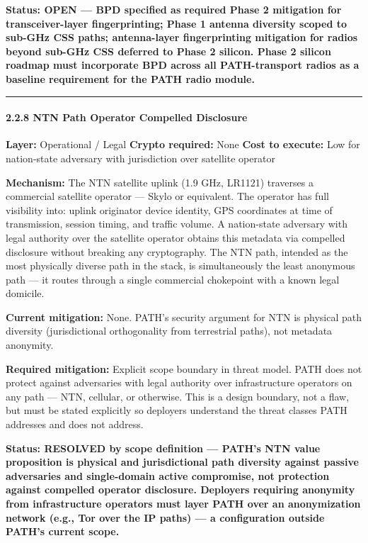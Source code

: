 \documentclass[
  11pt,
]{article}
\begin{document}
\textbf{Status: OPEN --- BPD specified as required Phase 2 mitigation
for transceiver-layer fingerprinting; Phase 1 antenna diversity scoped
to sub-GHz CSS paths; antenna-layer fingerprinting mitigation for radios
beyond sub-GHz CSS deferred to Phase 2 silicon. Phase 2 silicon roadmap
must incorporate BPD across all PATH-transport radios as a baseline
requirement for the PATH radio module.}

\begin{center}\rule{0.5\linewidth}{0.5pt}\end{center}

\hypertarget{ntn-path-operator-compelled-disclosure}{%
\paragraph{2.2.8 NTN Path Operator Compelled
Disclosure}\label{ntn-path-operator-compelled-disclosure}}

\textbf{Layer:} Operational / Legal \textbf{Crypto required:} None
\textbf{Cost to execute:} Low for nation-state adversary with
jurisdiction over satellite operator

\textbf{Mechanism:} The NTN satellite uplink (1.9 GHz, LR1121) traverses
a commercial satellite operator --- Skylo or equivalent. The operator
has full visibility into: uplink originator device identity, GPS
coordinates at time of transmission, session timing, and traffic volume.
A nation-state adversary with legal authority over the satellite
operator obtains this metadata via compelled disclosure without breaking
any cryptography. The NTN path, intended as the most physically diverse
path in the stack, is simultaneously the least anonymous path --- it
routes through a single commercial chokepoint with a known legal
domicile.

\textbf{Current mitigation:} None. PATH's security argument for NTN is
physical path diversity (jurisdictional orthogonality from terrestrial
paths), not metadata anonymity.

\textbf{Required mitigation:} Explicit scope boundary in threat model.
PATH does not protect against adversaries with legal authority over
infrastructure operators on any path --- NTN, cellular, or otherwise.
This is a design boundary, not a flaw, but must be stated explicitly so
deployers understand the threat classes PATH addresses and does not
address.

\textbf{Status: RESOLVED by scope definition --- PATH's NTN value
proposition is physical and jurisdictional path diversity against
passive adversaries and single-domain active compromise, not protection
against compelled operator disclosure. Deployers requiring anonymity
from infrastructure operators must layer PATH over an anonymization
network (e.g., Tor over the IP paths) --- a configuration outside PATH's
current scope.}
\end{document}
